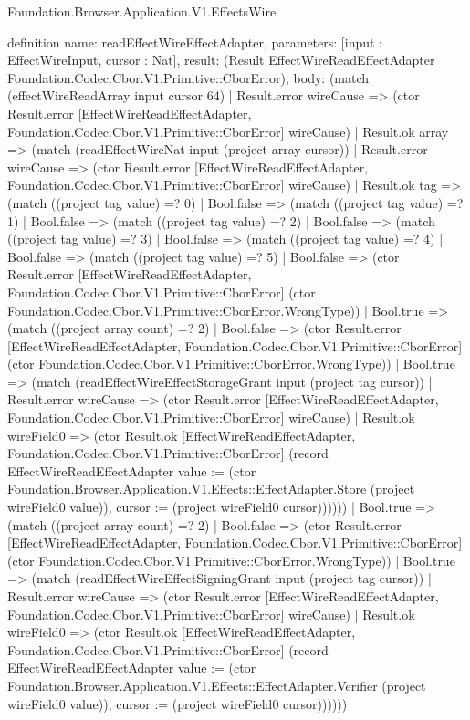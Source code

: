 \begin{lexlean}{Foundation.Browser.Application.V1.EffectsWire}
\begin{semanticmodule}
definition{
  name: readEffectWireEffectAdapter,
  parameters: [input : EffectWireInput, cursor : Nat],
  result: (Result EffectWireReadEffectAdapter Foundation.Codec.Cbor.V1.Primitive::CborError),
  body: (match (effectWireReadArray input cursor 64)
    | Result.error wireCause => (ctor Result.error [EffectWireReadEffectAdapter, Foundation.Codec.Cbor.V1.Primitive::CborError] wireCause)
    | Result.ok array => (match (readEffectWireNat input (project array cursor))
      | Result.error wireCause => (ctor Result.error [EffectWireReadEffectAdapter, Foundation.Codec.Cbor.V1.Primitive::CborError] wireCause)
      | Result.ok tag => (match ((project tag value) =? 0)
        | Bool.false => (match ((project tag value) =? 1)
          | Bool.false => (match ((project tag value) =? 2)
            | Bool.false => (match ((project tag value) =? 3)
              | Bool.false => (match ((project tag value) =? 4)
                | Bool.false => (match ((project tag value) =? 5)
                  | Bool.false => (ctor Result.error [EffectWireReadEffectAdapter, Foundation.Codec.Cbor.V1.Primitive::CborError] (ctor Foundation.Codec.Cbor.V1.Primitive::CborError.WrongType))
                  | Bool.true => (match ((project array count) =? 2)
                    | Bool.false => (ctor Result.error [EffectWireReadEffectAdapter, Foundation.Codec.Cbor.V1.Primitive::CborError] (ctor Foundation.Codec.Cbor.V1.Primitive::CborError.WrongType))
                    | Bool.true => (match (readEffectWireEffectStorageGrant input (project tag cursor))
                      | Result.error wireCause => (ctor Result.error [EffectWireReadEffectAdapter, Foundation.Codec.Cbor.V1.Primitive::CborError] wireCause)
                      | Result.ok wireField0 => (ctor Result.ok [EffectWireReadEffectAdapter, Foundation.Codec.Cbor.V1.Primitive::CborError] (record EffectWireReadEffectAdapter {value := (ctor Foundation.Browser.Application.V1.Effects::EffectAdapter.Store (project wireField0 value)), cursor := (project wireField0 cursor)})))))
                | Bool.true => (match ((project array count) =? 2)
                  | Bool.false => (ctor Result.error [EffectWireReadEffectAdapter, Foundation.Codec.Cbor.V1.Primitive::CborError] (ctor Foundation.Codec.Cbor.V1.Primitive::CborError.WrongType))
                  | Bool.true => (match (readEffectWireEffectSigningGrant input (project tag cursor))
                    | Result.error wireCause => (ctor Result.error [EffectWireReadEffectAdapter, Foundation.Codec.Cbor.V1.Primitive::CborError] wireCause)
                    | Result.ok wireField0 => (ctor Result.ok [EffectWireReadEffectAdapter, Foundation.Codec.Cbor.V1.Primitive::CborError] (record EffectWireReadEffectAdapter {value := (ctor Foundation.Browser.Application.V1.Effects::EffectAdapter.Verifier (project wireField0 value)), cursor := (project wireField0 cursor)})))))
}
\end{semanticmodule}
\end{lexlean}
